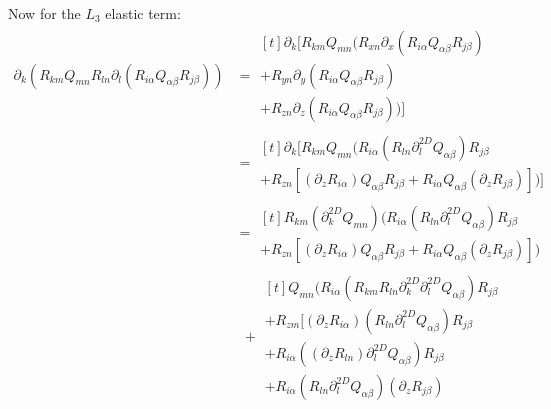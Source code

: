 \documentclass[reqno]{article}
\begin{document}
Now for the $L_3$ elastic term:
\begin{equation}
\begin{split}
    \partial_k \left( R_{km} Q_{mn} R_{ln} \partial_l (R_{i\alpha} Q_{\alpha \beta} R_{j \beta}) \right)
    &=
    \begin{multlined}[t]
        \partial_k \bigl[
        R_{km} Q_{mn} \bigl(
            R_{xn} \partial_x (R_{i\alpha} Q_{\alpha \beta} R_{j \beta})  \\
            + R_{yn} \partial_y (R_{i\alpha} Q_{\alpha \beta} R_{j \beta})  \\
            + R_{zn} \partial_z (R_{i\alpha} Q_{\alpha \beta} R_{j \beta})  
        \bigr)
        \bigr]
    \end{multlined} \\
    &=
    \begin{multlined}[t]
        \partial_k \bigl[
        R_{km} Q_{mn} \bigl(
             R_{i\alpha} \left( R_{ln} \partial^{2D}_l Q_{\alpha \beta}\right) R_{j \beta}  \\
            + R_{zn} \left[
                (\partial_z R_{i\alpha}) Q_{\alpha \beta} R_{j \beta}
                + R_{i\alpha} Q_{\alpha \beta} (\partial_z R_{j \beta})
            \right]
        \bigr)
        \bigr]
    \end{multlined} \\
    &=
    \begin{multlined}[t]
        R_{km} (\partial^{2D}_k Q_{mn}) \bigl(
             R_{i\alpha} \left( R_{ln} \partial^{2D}_l Q_{\alpha \beta}\right) R_{j \beta}  \\
            + R_{zn} \left[
                (\partial_z R_{i\alpha}) Q_{\alpha \beta} R_{j \beta}
                + R_{i\alpha} Q_{\alpha \beta} (\partial_z R_{j \beta})
            \right]
        \bigr)
    \end{multlined} \\
    &\:\:+
    \begin{multlined}[t]
        Q_{mn} \bigl(
            R_{i\alpha} \left( R_{km} R_{ln} \partial^{2D}_k \partial^{2D}_l Q_{\alpha \beta}\right) R_{j \beta}  \\
            +
            R_{zm} \bigl[ 
                (\partial_z R_{i\alpha}) \left( R_{ln} \partial^{2D}_l Q_{\alpha \beta}\right) R_{j \beta}  \\
                + R_{i\alpha} \left( (\partial_z R_{ln}) \partial^{2D}_l Q_{\alpha \beta}\right) R_{j \beta} \\
                + R_{i\alpha} \left( R_{ln} \partial^{2D}_l Q_{\alpha \beta}\right) (\partial_z R_{j \beta} )

\end{multlined}
\end{split}
\end{equation}
\end{document}

